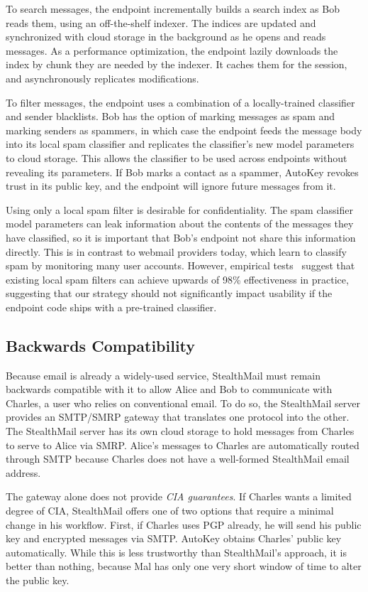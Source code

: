 To search messages, the endpoint incrementally builds a search index as Bob reads them, using an off-the-shelf indexer.  The indices are updated and synchronized with cloud storage in the background as he opens and reads messages.  As a performance optimization, the endpoint lazily downloads the index by chunk they are needed by the indexer.  It caches them for the session, and asynchronously replicates modifications.

To filter messages, the endpoint uses a combination of a locally-trained classifier and sender blacklists.  Bob has the option of marking messages as spam and marking senders as spammers, in which case the endpoint feeds the message body into its local spam classifier and replicates the classifier’s new model parameters to cloud storage.  This allows the classifier to be used across endpoints without revealing its parameters.  If Bob marks a contact as a spammer, AutoKey revokes trust in its public key, and the endpoint will ignore future messages from it.

Using only a local spam filter is desirable for confidentiality.  The spam classifier model parameters can leak information about the contents of the messages they have classified, so it is important that Bob’s endpoint not share this information directly.  This is in contrast to webmail providers today, which learn to classify spam by monitoring many user accounts.  However, empirical tests~\cite{local-spam-filter-eval} suggest that existing local spam filters can achieve upwards of 98\% effectiveness in practice, suggesting that our strategy should not significantly impact usability if the endpoint code ships with a pre-trained classifier.

\subsection{Backwards Compatibility}
Because email is already a widely-used service, StealthMail must remain backwards compatible with it to allow Alice and Bob to communicate with Charles, a user who relies on conventional email.  To do so, the StealthMail server provides an SMTP/SMRP gateway that translates one protocol into the other.  The StealthMail server has its own cloud storage to hold messages from Charles to serve to Alice via SMRP.  Alice’s messages to Charles are automatically routed through SMTP because Charles does not have a well-formed StealthMail email address.

The gateway alone does not provide \emph{CIA guarantees}.  If Charles wants a limited degree of CIA, StealthMail offers one of two options that require a minimal change in his workflow.  First, if Charles uses PGP already, he will send his public key and encrypted messages via SMTP.  AutoKey obtains Charles’ public key automatically.  While this is less trustworthy than StealthMail’s approach, it is better than nothing, because Mal has only one very short window of time to alter the public key.

